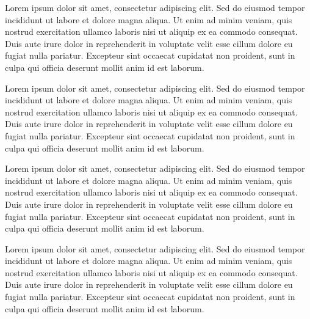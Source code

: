 Lorem ipsum dolor sit amet, consectetur adipiscing elit. Sed do eiusmod tempor incididunt ut labore et dolore magna aliqua. 
Ut enim ad minim veniam, quis nostrud exercitation ullamco laboris nisi ut aliquip ex ea commodo consequat. Duis aute irure dolor 
in reprehenderit in voluptate velit esse cillum dolore eu fugiat nulla pariatur. Excepteur sint occaecat cupidatat non proident, 
sunt in culpa qui officia deserunt mollit anim id est laborum.

Lorem ipsum dolor sit amet, consectetur adipiscing elit. Sed do eiusmod tempor incididunt ut labore et dolore magna aliqua. 
Ut enim ad minim veniam, quis nostrud exercitation ullamco laboris nisi ut aliquip ex ea commodo consequat. Duis aute irure dolor 
in reprehenderit in voluptate velit esse cillum dolore eu fugiat nulla pariatur. Excepteur sint occaecat cupidatat non proident, 
sunt in culpa qui officia deserunt mollit anim id est laborum.

Lorem ipsum dolor sit amet, consectetur adipiscing elit. Sed do eiusmod tempor incididunt ut labore et dolore magna aliqua. 
Ut enim ad minim veniam, quis nostrud exercitation ullamco laboris nisi ut aliquip ex ea commodo consequat. Duis aute irure dolor 
in reprehenderit in voluptate velit esse cillum dolore eu fugiat nulla pariatur. Excepteur sint occaecat cupidatat non proident, 
sunt in culpa qui officia deserunt mollit anim id est laborum.

Lorem ipsum dolor sit amet, consectetur adipiscing elit. Sed do eiusmod tempor incididunt ut labore et dolore magna aliqua. 
Ut enim ad minim veniam, quis nostrud exercitation ullamco laboris nisi ut aliquip ex ea commodo consequat. Duis aute irure dolor 
in reprehenderit in voluptate velit esse cillum dolore eu fugiat nulla pariatur. Excepteur sint occaecat cupidatat non proident, 
sunt in culpa qui officia deserunt mollit anim id est laborum.